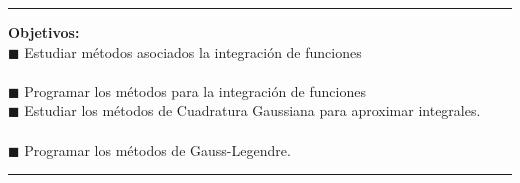 \documentclass[10pt,letterpaper]{article}
\begin{document}
\begin{minipage}[c]{5cm}
\begin{center}
{{\begin{minipage}[l][21cm]{5cm}
{\color{white}\rule[0.1cm]{5cm}{0.01cm}}
		{\color{ContenidosObjetivos} \textbf{ \small Objetivos:}}\\
					
{\footnotesize
{ \tiny $\blacksquare$} Estudiar métodos asociados la integración de funciones \\ \\
{ \tiny $\blacksquare$} Programar los métodos para
la integración de funciones\\[0.2cm]
{ \tiny $\blacksquare$} Estudiar los métodos de Cuadratura Gaussiana para aproximar integrales. \\ \\
{ \tiny $\blacksquare$} Programar los métodos de Gauss-Legendre.
}

{\color{white}\rule[0.1cm]{5cm}{0.01cm}}\\

%

\end{minipage}
}}
\end{center}
\end{minipage}	 


\newpage
\end{document}
